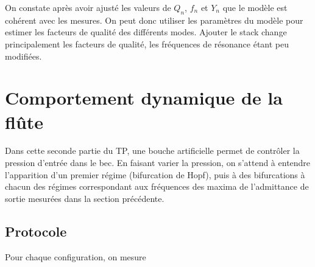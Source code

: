 \documentclass[atiam, article]{rapport} %
\begin{document}
On constate après avoir ajusté les valeurs de $Q_n$, $f_n$ et $Y_n$ que le modèle est cohérent avec les mesures. On peut donc utiliser les paramètres du modèle pour estimer les facteurs de qualité des différents modes. Ajouter le stack change principalement les facteurs de qualité, les fréquences de résonance étant peu modifiées.



\section{Comportement dynamique de la flûte}

Dans cette seconde partie du TP, une bouche artificielle permet de contrôler la pression d'entrée dans le bec. En faisant varier la pression, on s'attend à entendre l'apparition d'un premier régime (bifurcation de Hopf), puis à des bifurcations à chacun des régimes correspondant aux fréquences des maxima de l'admittance de sortie mesurées dans la section précédente.

\subsection{Protocole}

Pour chaque configuration, on mesure %

\printbibliography
\end{document}
